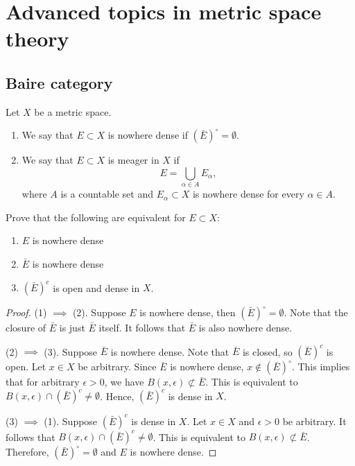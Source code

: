 \documentclass[a4paper]{article}
\author{Notes taken by \nauthor\vspace{5pt}\\ 
Lectures by Ian Tice\vspace{5pt}\\
Carnegie Mellon University}
\begin{document}
\maketitle

\tableofcontents

\section{Advanced topics in metric space theory}

\subsection{Baire category}

\begin{defi}
  Let $X$ be a metric space.
  \begin{enumerate}
    \item We say that $E \subset X$ is nowhere dense if $(\bar{E})^\circ =
          \emptyset$.
    \item We say that $E \subset X$ is meager in $X$ if
          \[
            E = \bigcup_{\alpha \in A} E_\alpha,
          \]
          where $A$ is a countable set and $E_\alpha \subset X$ is nowhere
          dense for every $\alpha \in A$.
  \end{enumerate}
\end{defi}

\begin{thm}
  Prove that the following are equivalent for $E \subset X$:
  \begin{enumerate}
    \item $E$ is nowhere dense
    \item $\bar{E}$ is nowhere dense
    \item $(\bar{E})^c$ is open and dense in $X$.
  \end{enumerate}
\end{thm}

\begin{proof}
  (1) $\implies$ (2). Suppose $E$ is nowhere dense, then
  $(\bar{E})^\circ = \emptyset$. Note that the closure
  of $\bar{E}$ is just $\bar{E}$ itself. It follows that
  $\bar{E}$ is also nowhere dense.

  (2) $\implies$ (3). Suppose $\bar{E}$ is nowhere dense.
  Note that $\bar{E}$ is closed, so $(\bar{E})^c$ is open.
  Let $x \in X$ be arbitrary. Since $\bar{E}$ is nowhere dense,
  $x \notin (\bar{E})^\circ$. This implies that for arbitrary
  $\epsilon > 0$, we have $B(x, \epsilon) \nsubset \bar{E}$.
  This is equivalent to $B(x, \epsilon) \cap (\bar{E})^c \neq
    \emptyset$. Hence, $(\bar{E})^c$ is dense in $X$.

  (3) $\implies$ (1). Suppose $(\bar{E})^c$ is dense in $X$.
  Let $x \in X$ and $\epsilon > 0$ be arbitrary. It follows
  that $B(x, \epsilon) \cap (\bar{E})^c \neq \emptyset$.
  This is equivalent to $B(x, \epsilon) \nsubset \bar{E}$.
  Therefore, $(\bar{E})^\circ = \emptyset$ and $E$ is nowhere
  dense.

\end{proof}
\end{document}
